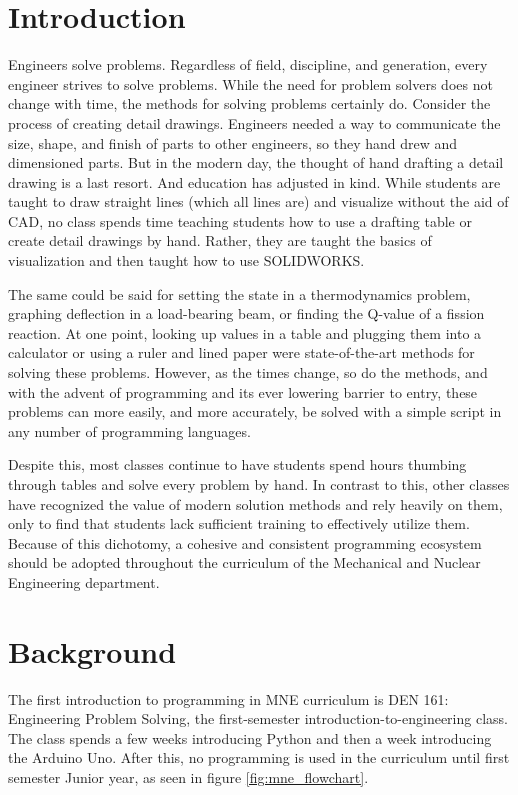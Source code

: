 \section{Introduction}

Engineers solve problems. Regardless of field, discipline, and generation, every engineer
strives to solve problems. While the need for problem solvers does not change with time,
the methods for solving problems certainly do. Consider the process of creating detail 
drawings. Engineers needed a way to communicate the size, shape, and finish of parts to 
other engineers, so they hand drew and dimensioned parts. But in the modern day, the 
thought of hand drafting a detail drawing is a last resort. And education has adjusted in
kind. While students are taught to draw straight lines (which all lines are) and visualize
without the aid of CAD, no class spends time teaching students how to use a drafting table
or create detail drawings by hand. Rather, they are taught the basics of visualization
and then taught how to use SOLIDWORKS.

The same could be said for setting the state in a thermodynamics problem, graphing
deflection in a load-bearing beam, or finding the Q-value of a fission reaction. At one
point, looking up values in a table and plugging them into a calculator or using a ruler
and lined paper were state-of-the-art methods for solving these problems. However, as the 
times change, so do the methods, and with the advent of programming and its ever lowering 
barrier to entry, these problems can more easily, and more accurately, be solved with a 
simple script in any number of programming languages.

Despite this, most classes continue to have students spend hours thumbing through tables
and solve every problem by hand. In contrast to this, other classes have recognized the
value of modern solution methods and rely heavily on them, only to find that students
lack sufficient training to effectively utilize them. Because of this dichotomy, a cohesive 
and consistent programming ecosystem should be adopted throughout the curriculum 
of the Mechanical and Nuclear Engineering department.


\section{Background}

The first introduction to programming in MNE curriculum is DEN 161: Engineering Problem Solving,
the first-semester introduction-to-engineering class. The class spends a few weeks introducing
Python and then a week introducing the Arduino Uno. After this, no programming is used in the
curriculum until first semester Junior year, as seen in figure \ref{fig:mne_flowchart}. 

